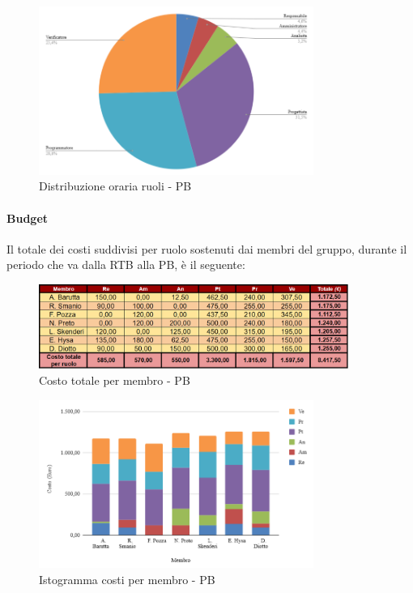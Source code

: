 \begin{figure}[H]
    \centering
    \includegraphics[width=0.8\textwidth]{../Images/distribuzioneOrariaPBRuoli.png}
    \caption{Distribuzione oraria ruoli - PB}
    \label{fig:GraficoDistribuzioneOrePB}
\end{figure}

\vspace{0.6cm}

\paragraph{Budget}
Il totale dei costi suddivisi per ruolo sostenuti dai membri del gruppo, durante il periodo che va dalla RTB alla PB, è il seguente:
\begin{figure}[H]
    \centering
    \includegraphics[width=0.9\textwidth]{../Images/RiepilogoPrezziPB.png}
    \caption{Costo totale per membro - PB}
    \label{fig:CostiPB}
\end{figure}
\begin{figure}[H]
    \centering
    \includegraphics[width=0.8\textwidth]{../Images/graficoCostoRuoloPB.png}
    \caption{Istogramma costi per membro - PB}
    \label{fig:GraficoCostoPB}
\end{figure}


